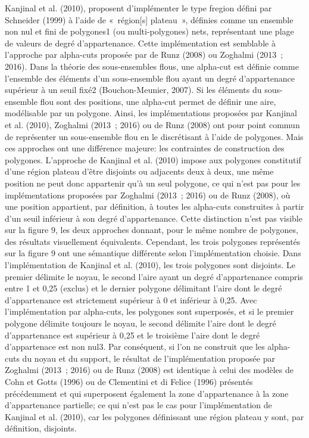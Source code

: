 Kanjinal et al. (2010), proposent d’implémenter le type fregion défini
par Schneider (1999) à l’aide de « région[s] plateau », définies comme
un ensemble non nul et fini de polygones1 (ou multi-polygones) nets,
représentant une plage de valeurs de degré d’appartenance. Cette
implémentation est semblable à l’approche par alpha-cuts proposée par
de Runz (2008) ou Zoghalmi (2013 ; 2016). Dans la théorie des
sous-ensembles flous, une alpha-cut est définie comme l’ensemble des
éléments d’un sous-ensemble flou ayant un degré d’appartenance
supérieur à un seuil fixé2 (Bouchon-Meunier, 2007). Si les éléments du
sous-ensemble flou sont des positions, une alpha-cut permet de définir
une aire, modélisable par un polygone. Ainsi, les implémentations
proposées par Kanjinal et al. (2010), Zoghalmi (2013 ; 2016) ou de
Runz (2008) ont pour point commun de représenter un sous-ensemble flou
en le discrétisant à l’aide de polygones. Mais ces approches ont une
différence majeure: les contraintes de construction des
polygones. L’approche de Kanjinal et al. (2010) impose aux polygones
constitutif d’une région plateau d’être disjoints ou adjacents deux à
deux, une même position ne peut donc appartenir qu’à un seul polygone,
ce qui n’est pas pour les implémentations proposées par Zoghalmi
(2013 ; 2016) ou de Runz (2008), où une position appartient, par
définition, à toutes les alpha-cuts construites à partir d’un seuil
inférieur à son degré d’appartenance. Cette distinction n’est pas
visible sur la figure 9, les deux approches donnant, pour le même
nombre de polygones, des résultats visuellement
équivalents. Cependant, les trois polygones représentés sur la figure
9 ont une sémantique différente selon l’implémentation choisie. Dans
l’implémentation de Kanjinal et al. (2010), les trois polygones sont
disjoints. Le premier délimite le noyau, le second l’aire ayant un
degré d’appartenance compris entre 1 et 0,25 (exclus) et le dernier
polygone délimitant l’aire dont le degré d’appartenance est
strictement supérieur à 0 et inférieur à 0,25. Avec l’implémentation
par alpha-cuts, les polygones sont superposés, et si le premier
polygone délimite toujours le noyau, le second délimite l’aire dont le
degré d’appartenance est supérieur à 0,25 et le troisième l’aire dont
le degré d’appartenace est non nul3. Par conséquent, si l’on ne
construit que les alpha-cuts du noyau et du support, le résultat de
l’implémentation proposée par Zoghalmi (2013 ; 2016) ou de Runz (2008)
est identique à celui des modèles de Cohn et Gotts (1996) ou de
Clementini et di Felice (1996) présentés précédemment et qui
superposent également la zone d’appartenance à la zone d’appartenance
partielle; ce qui n’est pas le cas pour l’implémentation de Kanjinal
et al. (2010), car les polygones définissant une région plateau y
sont, par définition, disjoints.

